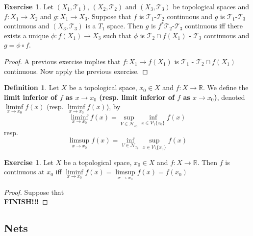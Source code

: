 \documentclass[12pt]{amsart}
\theoremstyle{definition}
\newtheorem{defn}[definition]{Definition}
\newtheorem{ex}[definition]{Exercise}
\newcommand{\R}{\mathbb{R}}
\newcommand{\MN}{\mathcal{N}}
\newcommand{\MT}{\mathcal{T}}
\newcommand{\lex}[1]{\label{ex:#1}}
\begin{document}
	\begin{ex} \lex{}
	Let $(X_1, \MT_1)$, $(X_2, \MT_2)$ and $(X_3, \MT_3)$ be topological spaces and $f: X_1 \rightarrow X_2$ and $g:X_1 \rightarrow X_3$. Suppose that $f$ is $\MT_1$-$\MT_2$ continuous and $g$ is $\MT_1$-$\MT_3$ continuous and $(X_3, \MT_3)$ is a $T_1$ space. Then $g$ is $f^*\MT_2$-$\MT_3$ continuous iff there exists a unique $\phi: f(X_1) \rightarrow X_3$ such that $\phi$ is $\MT_2 \cap f(X_1)$ - $\MT_3$ continuous and $g = \phi \circ f$. \\
	\end{ex}
	
	\begin{proof}
	A previous exercise implies that $f: X_1 \rightarrow f(X_1)$ is $\MT_1$ - $\MT_2 \cap f(X_1)$ continuous. Now apply the previous exercise. 
	\end{proof}
	
	\begin{defn}
		Let $X$ be a topological space, $x_0 \in X$ and $f:X \rightarrow \R$. We define the \textbf{limit inferior of $f$ as $x \rightarrow x_0$ (resp. limit inferior of $f$ as $x \rightarrow x_0$)}, denoted $\liminf\limits_{x \rightarrow x_0}f(x)$ (resp. $\liminf\limits_{x \rightarrow x_0}f(x)$), by 
		$$\liminf_{x \rightarrow x_0} f(x) = \sup_{V \in \MN_{x_0}} \inf_{x \in V \setminus \{x_0\}} f(x)$$
		resp. 
		$$\limsup_{x \rightarrow x_0} f(x) = \inf_{V \in \MN_{x_0}} \sup_{x \in V \setminus \{x_0\}} f(x)$$
	\end{defn}

	\begin{ex}
		Let $X$ be a topological space, $x_0 \in X$ and $f:X \rightarrow \R$. Then $f$ is continuous at $x_0$ iff $\liminf\limits_{x \rightarrow x_0}f(x) = \limsup\limits_{x \rightarrow x_0}f(x) = f(x_0)$ 
	\end{ex}

	\begin{proof}
		Suppose that \\
		\textbf{FINISH!!!}
	\end{proof}














\newpage
\subsection{Nets}	
\end{document}
